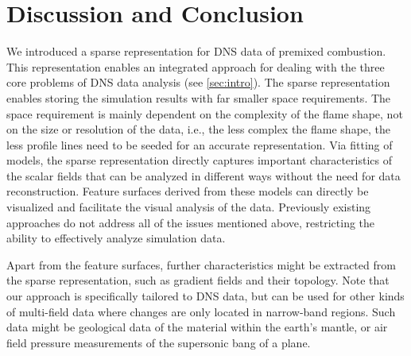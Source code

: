 \section{Discussion and Conclusion}
\label{sec:conclusion}
%
We introduced a sparse representation for \ac{DNS} data of premixed combustion. This
representation enables an integrated approach for dealing with the three core
problems of \ac{DNS} data analysis (see \cref{sec:intro}). The sparse
representation enables storing the simulation results with far smaller space
requirements. The space requirement is mainly dependent on the complexity of the
flame shape, not on the size or resolution of the data, i.e., the less complex
the flame shape, the less profile lines need to be seeded for an accurate
representation. Via fitting of models, the sparse representation directly
captures important characteristics of the scalar fields that can be analyzed in
different ways without the need for data reconstruction. Feature surfaces
derived from these models can directly be visualized and facilitate the visual
analysis of the data. Previously existing approaches do not address all of the
issues mentioned above, restricting the ability to effectively analyze
simulation data.


Apart from the feature surfaces, further characteristics might be extracted from
the sparse representation, such as gradient fields and their topology.
Note that our approach is specifically tailored to \ac{DNS} data, but can be used
for other kinds of multi-field data where changes are only located in 
narrow-band regions. Such data might be geological data of the material within
the earth's mantle, or air field pressure measurements of the supersonic bang of
a plane.

